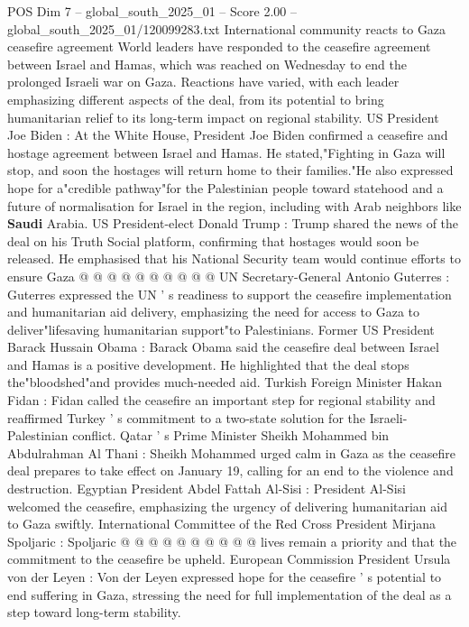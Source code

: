 \begin{textsample}{POS Dim 7 – global\_south\_2025\_01 – Score 2.00 – global\_south\_2025\_01/120099283.txt}  \label{ex:f7_pos_251}
International community reacts to Gaza ceasefire agreement World leaders have responded to the ceasefire agreement between Israel and Hamas, which was reached on Wednesday to end the prolonged Israeli war on Gaza.
Reactions have varied, with each leader emphasizing different aspects of the deal, from its potential to bring humanitarian relief to its long-term impact on regional stability.
US President Joe Biden : At the White House, President Joe Biden confirmed a ceasefire and hostage agreement between Israel and Hamas.
He stated,"Fighting in Gaza will stop, and soon the hostages will return home to their families."He also expressed hope for a"credible pathway"for the Palestinian people toward statehood and a future of normalisation for Israel in the region, including with Arab neighbors like \textbf{Saudi} Arabia.
US President-elect Donald Trump : Trump shared the news of the deal on his Truth Social platform, confirming that hostages would soon be released.
He emphasised that his National Security team would continue efforts to ensure Gaza @ @ @ @ @ @ @ @ @ @ UN Secretary-General Antonio Guterres : Guterres expressed the UN ' s readiness to support the ceasefire implementation and humanitarian aid delivery, emphasizing the need for access to Gaza to deliver"lifesaving humanitarian support"to Palestinians.
Former US President Barack Hussain Obama : Barack Obama said the ceasefire deal between Israel and Hamas is a positive development.
He highlighted that the deal stops the"bloodshed"and provides much-needed aid.
Turkish Foreign Minister Hakan Fidan : Fidan called the ceasefire an important step for regional stability and reaffirmed Turkey ' s commitment to a two-state solution for the Israeli-Palestinian conflict.
Qatar ' s Prime Minister Sheikh Mohammed bin Abdulrahman Al Thani : Sheikh Mohammed urged calm in Gaza as the ceasefire deal prepares to take effect on January 19, calling for an end to the violence and destruction.
Egyptian President Abdel Fattah Al-Sisi : President Al-Sisi welcomed the ceasefire, emphasizing the urgency of delivering humanitarian aid to Gaza swiftly.
International Committee of the Red Cross President Mirjana Spoljaric : Spoljaric @ @ @ @ @ @ @ @ @ @ lives remain a priority and that the commitment to the ceasefire be upheld.
European Commission President Ursula von der Leyen : Von der Leyen expressed hope for the ceasefire ' s potential to end suffering in Gaza, stressing the need for full implementation of the deal as a step toward long-term stability.

\end{textsample}
